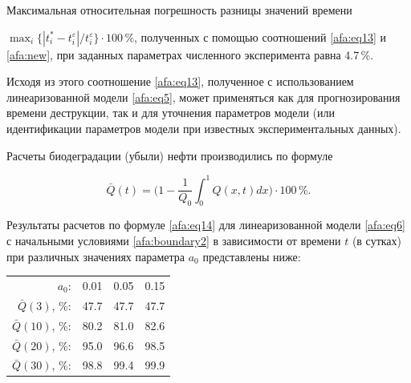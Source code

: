 \smallskip



Максимальная относительная погрешность разницы значений времени \linebreak

$\max _i \bigl\{|t_i^* - t_i^\varepsilon | / t_i^\varepsilon \bigr\}\cdot 100\,\%$, полученных с помощью соотношений \eqref{afa:eq13} и \eqref{afa:new}, при заданных параметрах  численного эксперимента равна 4.7\,\%.

Исходя из этого соотношение \eqref{afa:eq13}, полученное с использованием линеаризованной модели \eqref{afa:eq5}, может применяться как для прогнозирования времени деструкции, так и для уточнения параметров модели (или идентификации параметров модели при известных экспериментальных данных). 





Расчеты биодеградации (убыли) нефти  производились по формуле

\begin{equation}

\label{afa:eq14}

\bar {Q}(t)=\biggl( 1- \frac{1}{Q_0} \int_0^1 Q(x, t)dx \biggr)\cdot 100\,\%.

\end{equation}

Результаты расчетов по формуле  \eqref{afa:eq14} для линеаризованной модели \eqref{afa:eq6} с начальными условиями \eqref{afa:boundary2}  в зависимости от времени $t$ (в сутках) при различных значениях параметра $a_0$  представлены ниже:





\smallskip



{ \centering



\begin{tabular}{rrrr} 

$a_0$\phantom{, \%}: & 0.01 & 0.05 & 0.15 \\ 

$\bar Q (3)$, \%:   & 47.7   & 47.7 & 47.7  \\ 

$\bar Q (10)$, \%:   & 80.2   & 81.0 & 82.6  \\ 

$\bar Q (20)$, \%:   & 95.0   & 96.6 & 98.5  \\ 

$\bar Q (30)$, \%:   & 98.8   & 99.4 & 99.9  \\ 

\end{tabular}



}



